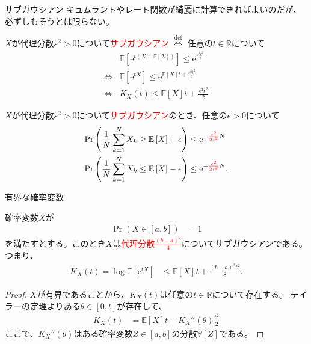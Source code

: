 \documentclass[lualatex,handout]{beamer}
\newcommand{\emm}[1]{\textcolor{red}{#1}}
\newcommand{\expt}[1]{\mathbb{E}\left[#1\right]}
\newcommand{\var}[1]{\mathbb{V}\left[#1\right]}
\theoremstyle{definition}
\begin{document}
\begin{frame}{サブガウシアン}
\small
キュムラントやレート関数が綺麗に計算できればよいのだが、必ずしもそうとは限らない。

\vspace{1em}
$X$が代理分散$s^2>0$について\emm{サブガウシアン} $\stackrel{\mathrm{def}}{\iff}$ 任意の$t\in\mathbb{R}$について
\begin{align*}
&\expt{\mathrm{e}^{t(X-\expt{X})}} \le \mathrm{e}^{\frac{s^2t^2}2}\\
\iff&\expt{\mathrm{e}^{tX}} \le \mathrm{e}^{\expt{X}t+\frac{s^2t^2}2}\\
\iff& K_X(t) \le {\expt{X}t+\frac{s^2t^2}2}
\end{align*}

\vspace{1em}
$X$が代理分散$s^2>0$について\emm{サブガウシアン}のとき、任意の$\epsilon>0$について
\begin{align*}
\Pr\left(\frac1N\sum_{k=1}^N X_k \ge \expt{X} + \epsilon\right) &\le \mathrm{e}^{-\emm{\frac{\epsilon^2}{2s^2}}N}\\
\Pr\left(\frac1N\sum_{k=1}^N X_k \le \expt{X} - \epsilon\right) &\le \mathrm{e}^{-\emm{\frac{\epsilon^2}{2s^2}}N}.
\end{align*}
\end{frame}

\begin{frame}{有界な確率変数}
\small
\begin{lemma}
確率変数$X$が
\begin{align*}
\Pr(X\in[a,b])&=1
\end{align*}
を満たすとする。このとき$X$は\emm{代理分散$\frac{(b-a)^2}4$}についてサブガウシアンである。
つまり、
\begin{align*}
K_X(t)=\log\expt{\mathrm{e}^{tX}} &\le \expt{X}t + \frac{(b-a)^2t^2}8.
\end{align*}
\end{lemma}
\begin{proof}
$X$が有界であることから、$K_X(t)$は任意の$t\in\mathbb{R}$について存在する。
テイラーの定理よりある$\theta\in[0,t]$が存在して、
\begin{align*}
K_X(t) &= \expt{X}t + K_X''(\theta)\frac{t^2}2
\end{align*}
ここで、$K_X''(\theta)$はある確率変数$Z\in[a,b]$の分散$\var{Z}$である。
\end{proof}
\end{frame}
\end{document}
